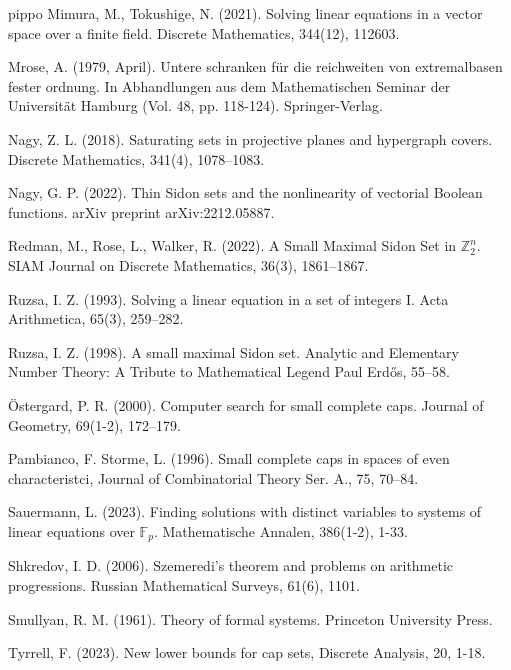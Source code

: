\documentclass[11pt]{article}
\numberwithin{table}{section}
\newcommand{\F}{{\mathbb F}}
\theoremstyle{definition}
\DeclareMathOperator{\AG}{{AG}}
\begin{document}
{\begin{thebibliography}{pippo}
			 Mimura, M.,  Tokushige, N. (2021). Solving linear equations in a vector space over a finite field. Discrete Mathematics, 344(12), 112603.
			
			  Mrose, A. (1979, April). Untere schranken für die reichweiten von extremalbasen fester ordnung. In Abhandlungen aus dem Mathematischen Seminar der Universität Hamburg (Vol. 48, pp. 118-124). Springer-Verlag.
			
			 Nagy, Z. L. (2018). Saturating sets in projective planes and hypergraph covers. Discrete Mathematics, 341(4), 1078--1083.
			
			 Nagy, G. P. (2022). Thin Sidon sets and the nonlinearity of vectorial Boolean functions. arXiv preprint arXiv:2212.05887.
			
			 Redman, M., Rose, L.,  Walker, R. (2022). A Small Maximal Sidon Set in $\mathbb{Z}_2^n$. SIAM Journal on Discrete Mathematics, 36(3), 1861--1867.
			
			 Ruzsa, I. Z. (1993). Solving a linear equation in a set of integers I. Acta Arithmetica, 65(3), 259--282.
			
			 Ruzsa, I. Z. (1998). A small maximal Sidon set. Analytic and Elementary Number Theory: A Tribute to Mathematical Legend Paul Erdős, 55--58.
			
			
			 Östergard, P. R. (2000). Computer search for small complete caps. Journal of Geometry, 69(1-2), 172--179.
			
			 Pambianco, F. Storme, L. (1996). Small complete caps in spaces of even characteristci, Journal of Combinatorial Theory Ser. A.,  75, 70--84.
			
			
			 Sauermann, L. (2023). Finding solutions with distinct variables to systems of linear equations over $\F_p$. Mathematische Annalen, 386(1-2), 1-33.
			
			 Shkredov, I. D. (2006). Szemeredi's theorem and problems on arithmetic progressions. Russian Mathematical Surveys, 61(6), 1101.
			
			 Smullyan, R. M. (1961). Theory of formal systems. Princeton University Press.
			
			 Tyrrell, F. (2023). New lower bounds for cap sets,  Discrete Analysis, 20, 1-18.
			
			
			
	\end{thebibliography}}
	
\end{document}
